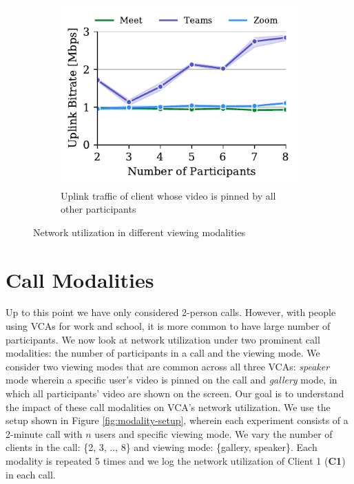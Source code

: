 \begin{figure}[ht]
\begin{subfigure}[t]{.33\textwidth}
    \label{fig:gallery-send}
\end{subfigure}
\hfill
\begin{subfigure}[t]{.33\textwidth}
  \centering
   \captionsetup{width=.9\linewidth}
    \includegraphics[width=1\textwidth,keepaspectratio]{../figures/modality/speaker_send.pdf}
    \caption{Uplink traffic of client whose video is pinned by all other participants}
    \label{fig:speaker-send}
\end{subfigure}
\caption{Network utilization in different viewing modalities}
\label{fig:viewing-mode}
\end{figure}

\section{Call Modalities}\label{sec:usage_modality}






Up to this point we have only considered 2-person calls. However, with people using VCAs for work and school, it is more common to have large number of participants. We now look at network utilization under two prominent call modalities: the number of participants in a call and the viewing mode. We consider two viewing modes that are common across all three VCAs: \textit{speaker} mode wherein a specific user's video is pinned on the call and \textit{gallery} mode, in which all participants' video are shown on the screen. Our goal is to understand the impact of these call modalities on VCA's network utilization. We use the setup shown in Figure \ref{fig:modality-setup}, wherein each experiment consists of a 2-minute call with $n$ users and specific viewing mode. We vary the number of clients in the call: \{2, 3, .., 8\} and viewing mode: \{gallery, speaker\}. Each modality is repeated 5 times and we log the network utilization of Client 1 (\textbf{C1}) in each call. 


